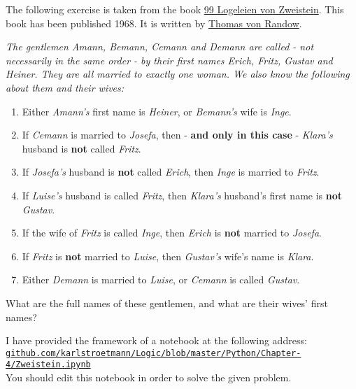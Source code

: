 \exerciseEng
The following exercise is taken from the book 
\href{https://www.amazon.de/Logeleien-Zweistein-ihren-Antworten-Wegner/dp/B006YF0VUE}{99 Logeleien von Zweistein}.
This book has been published 1968.  It is written by 
\href{http://de.wikipedia.org/wiki/Thomas_von_Randow}{Thomas von Randow}.

\begin{minipage}{0.95\linewidth}
  {\sl
    The gentlemen \emph{Amann}, \emph{Bemann}, \emph{Cemann} and \emph{Demann} are called - not
    necessarily in the same order - by their 
    first names \emph{Erich}, \emph{Fritz}, \emph{Gustav} and \emph{Heiner}. They are all married to
    exactly one woman. We also know the following about them and their wives: 
    \begin{enumerate}
    \item Either \emph{Amann's} first name is \emph{Heiner}, or \emph{Bemann's} wife is \emph{Inge}.
    \item If \emph{Cemann} is married to \emph{Josefa}, then - \textbf{and only in this case} -
          \emph{Klara's} husband is \textbf{not} called \emph{Fritz}.
    \item If \emph{Josefa's} husband is \textbf{not} called \emph{Erich}, then \emph{Inge} is married to
          \emph{Fritz}. 
    \item If \emph{Luise's} husband is called \emph{Fritz}, then \emph{Klara's} husband's first name is
          \textbf{not} \emph{Gustav}. 
    \item If the wife of \emph{Fritz} is called \emph{Inge}, then \emph{Erich} is \textbf{not} married to
          \emph{Josefa}. 
    \item If \emph{Fritz} is \textbf{not} married to \emph{Luise}, then \emph{Gustav's} wife's name is \emph{Klara}.
    \item Either \emph{Demann} is married to \emph{Luise}, or \emph{Cemann} is called \emph{Gustav}.
    \end{enumerate}
    What are the full names of these gentlemen, and what are their wives' first names?}
\end{minipage}
\vspace*{0.3cm}

\noindent
I have provided the framework of a notebook at the following address:
\\[0.2cm]
\hspace*{1.3cm}
\href{https://github.com/karlstroetmann/Logic/blob/master/Python/Chapter-4/Zweistein.ipynb}{\texttt{github.com/karlstroetmann/Logic/blob/master/Python/Chapter-4/Zweistein.ipynb}}
\\[0.2cm]
You should edit this notebook in order to solve the given problem.

